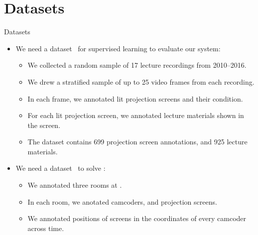 \section{Datasets}

\begin{frame}{Datasets }
\begin{itemize}
\item<1-11> We need a dataset~\cite{implementation-dataset} for
  \alert{supervised learning} to \alert{evaluate} our system:
\begin{itemize}
\item<1-11> We collected a random sample of \alert{17 lecture recordings} from 2010--2016.
\item<2-11> We drew a stratified sample of \alert{up to 25 video frames} from each recording.
\item<4-11> In each frame, we annotated \alert{lit projection screens} and
  their condition.
\item<6-11> For each lit projection screen, we annotated \alert{lecture materials} shown in
  the screen.
\item<8-11> The dataset contains \alert{699 projection screen annotations}, and
  \alert{925 lecture materials}.
\end{itemize}
\item<9-11> We need a dataset~\cite{implementation-screens} to solve
  :
\begin{itemize}
\item<9-11> We annotated \alert{three rooms} at .
\item<10-11> In each room, we anotated \alert{camcoders}, and \alert{projection screens}.
\item<11-11> We annotated \alert{positions of screens} in the coordinates of
  every camcoder across time.
\end{itemize}
\end{itemize}


\end{frame}
